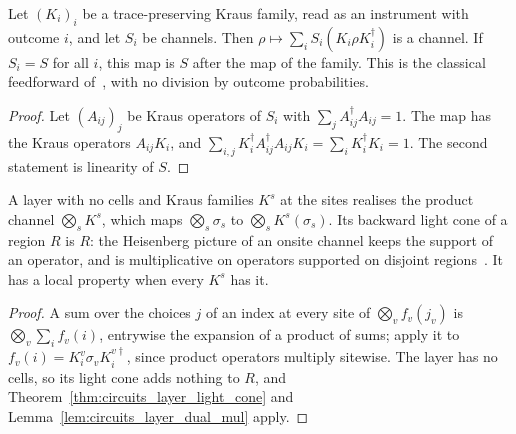 \begin{lemma}
    \label{lem:protocols_instrument_feedforward}
    \leanok
    Let $(K_i)_i$ be a trace-preserving Kraus family, read as an instrument with outcome $i$,
    and let $S_i$ be channels. Then $\rho\mapsto\sum_iS_i(K_i\rho K_i^\dagger)$ is a channel.
    If $S_i=S$ for all $i$, this map is $S$ after the map of the family. This is the
    classical feedforward of~\cite{Piroli2021LOCC}, with no division by outcome
    probabilities.
\end{lemma}
\begin{proof}\leanok
    Let $(A_{ij})_j$ be Kraus operators of $S_i$ with $\sum_jA_{ij}^\dagger A_{ij}=1$. The map
    has the Kraus operators $A_{ij}K_i$, and
    $\sum_{i,j}K_i^\dagger A_{ij}^\dagger A_{ij}K_i=\sum_iK_i^\dagger K_i=1$. The second
    statement is linearity of $S$.
\end{proof}

\begin{lemma}
    \label{lem:protocols_onsite}
    \leanok
    A layer with no cells and Kraus families $K^s$ at the sites realises the product channel
    $\bigotimes_sK^s$, which maps $\bigotimes_s\sigma_s$ to $\bigotimes_sK^s(\sigma_s)$. Its
    backward light cone of a region $R$ is $R$: the Heisenberg picture of an onsite channel
    keeps the support of an operator, and is multiplicative on operators supported on
    disjoint regions~\cite{Piroli2021LOCC}. It has a local property when every $K^s$ has it.
\end{lemma}
\begin{proof}\leanok
    A sum over the choices $j$ of an index at every site of $\bigotimes_vf_v(j_v)$ is
    $\bigotimes_v\sum_if_v(i)$, entrywise the expansion of a product of sums; apply it to
    $f_v(i)=K^v_i\sigma_vK_i^{v\dagger}$, since product operators multiply sitewise. The layer
    has no cells, so its light cone adds nothing to $R$, and
    Theorem~\ref{thm:circuits_layer_light_cone} and Lemma~\ref{lem:circuits_layer_dual_mul}
    apply.
\end{proof}

